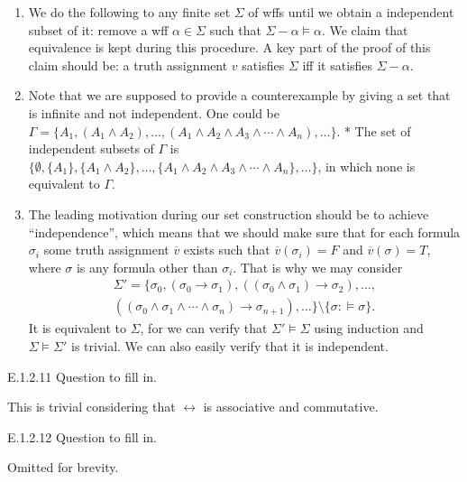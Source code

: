 \begin{enumerate}[label=(\alph*)]
  \item
        We do the following to any finite set $\Sigma$ of wffs until we obtain a independent subset of it: remove a wff $\alpha\in \Sigma$ such that $\Sigma-\alpha\vDash \alpha$. We claim that equivalence is kept during this procedure. A key part of the proof of this claim should be: a truth assignment $v$ satisfies $\Sigma$ iff it satisfies $\Sigma-\alpha$.
  \item
        Note that we are supposed to provide a counterexample by giving a set that is infinite and not independent. One could be $\Gamma=\{A_1, (A_1\wedge A_2), \dots, (A_1\wedge A_2\wedge A_3\wedge\cdots\wedge A_n),\dots\}$. * The set of independent subsets of $\Gamma$ is $\{\emptyset, \{A_1\}, \{A_1\wedge A_2\},\dots, \{A_1\wedge A_2\wedge A_3\wedge\cdots\wedge A_n\},\dots\}$, in which none is equivalent to $\Gamma$.
  \item
        The leading motivation during our set construction should be to achieve ``independence'', which means that we should make sure that for each formula $\sigma_i$ some truth assignment $\overline{v}$ exists such that $\overline{v}(\sigma_i)=F$ and $\overline{v}(\sigma)=T$, where $\sigma$ is any formula other than $\sigma_i$. That is why we may consider
        \begin{align*}
          \Sigma'=\{\sigma_0,(\sigma_0\rightarrow \sigma_1), ((\sigma_0\wedge \sigma_1)\rightarrow \sigma_2),\dots, \\((\sigma_0\wedge \sigma_1\wedge\cdots\wedge \sigma_n)\rightarrow \sigma_{n+1}),\dots\}\setminus\{\sigma:\vDash \sigma\}.
        \end{align*}
        It is equivalent to $\Sigma$, for we can verify that $\Sigma'\vDash \Sigma$ using induction and $\Sigma\vDash \Sigma'$ is trivial. We can also easily verify that it is independent.
\end{enumerate}

\begin{exercise}{E.1.2.11}
  Question to fill in.
\end{exercise}

This is trivial considering that $\leftrightarrow$ is associative and commutative.

\begin{exercise}{E.1.2.12}
  Question to fill in.
\end{exercise}

Omitted for brevity.


